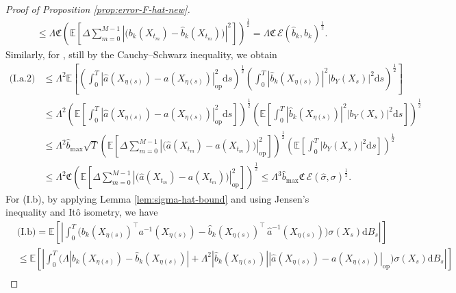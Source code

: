 \documentclass{article}
\theoremstyle{plain}
\theoremstyle{definition}
\theoremstyle{remark}
\renewcommand{\d}{\mathrm{d}}
\newcommand{\EE}{\mathbb{E}}
\newcommand{\calE}{\mathcal{E}}
\begin{document}
\begin{proof}[Proof of Proposition \ref{prop:error-F-hat-new}]
\begin{align}
    &\leq \Lambda \mathfrak{C}\left(\EE \left[\Delta\sum_{m=0}^{M-1}\left|\big( b_k(X_{t_m})-\widehat b_k(X_{t_m})\big)\right|^2\right]\right)^{\frac{1}{2}}=\Lambda \mathfrak{C}\,  \calE(\widehat b_k, b_k)^{\frac{1}{2}}.
\end{align}
Similarly, for , still by the Cauchy–Schwarz inequality,  we obtain 
\begin{align}
    \text{(I.a.2)}&\leq \Lambda^2\EE \left[\left(\int_{0}^T \left|\widehat{a}(X_{\eta(s)})-a(X_{\eta(s)})\right|_{\mathrm{op}}^2\d s\right)^{\frac{1}{2}}\left(\int_{0}^T|\widehat b_k(X_{\eta(s)})|^2\left|b_Y(X_s) \right|^2\d s\right)^{\frac{1}{2}} \right]\nonumber\\
    &\leq \Lambda^2\left(\EE \left[\int_{0}^T \left|\widehat{a}(X_{\eta(s)})-a(X_{\eta(s)})\right|_{\mathrm{op}}^2\d s\right]\right)^{\frac{1}{2}}\left(\EE \left[\int_{0}^T|\widehat{b}_k(X_{\eta(s)})|^2\left|b_Y(X_s) \right|^2\d s \right]\right)^{\frac{1}{2}}\nonumber\\
    &\leq \Lambda^2 \widehat{b}_{\max}\sqrt{T}\left(\EE \left[\Delta\sum_{m=0}^{M-1}\left|\big( \widehat a(X_{t_m})-a(X_{t_m})\big)\right|_{\mathrm{op}}^2\right]\right)^{\frac{1}{2}} \left(\EE \left[\int_{0}^T\left|b_Y(X_s) \right|^2\d s \right]\right)^{\frac{1}{2}}\nonumber\\
    &\leq \Lambda^2\mathfrak{C}\left(\EE \left[\Delta\sum_{m=0}^{M-1}\left|\big( \widehat a(X_{t_m})-a(X_{t_m})\big)\right|_{\mathrm{op}}^2\right]\right)^{\frac{1}{2}}\leq \Lambda^{3}\widehat{b}_{\max}\mathfrak{C}\,\mathcal{E}(\widehat\sigma,\sigma)^{\frac{1}{2}}. \nonumber
\end{align}
For (I.b), by applying Lemma \ref{lem:sigma-hat-bound} and using Jensen's inequality and It\^o isometry, we have
\begin{align}
  & \text{(I.b)}= \EE \left[\left|\int_{0}^T \Big( b_k(X_{\eta(s)})^{\top}a^{-1}(X_{\eta(s)})-\widehat b_k(X_{\eta(s)})^{\top}\,\widehat{a}^{-1}(X_{\eta(s)})\Big)\sigma(X_s) \d B_s \right|\right]\nonumber\\
   &\leq \EE \left[\left|\int_{0}^T \Big( \Lambda |b_k(X_{\eta(s)})-\widehat b_k(X_{\eta(s)})|+\Lambda^2|\widehat b_k(X_{\eta(s)})|\left|\widehat{a}(X_{\eta(s)})-a(X_{\eta(s)})\right|_{\mathrm{op}}\Big)\sigma(X_s) \d B_s \right|\right]\nonumber\\

\end{align}
\end{proof}
\end{document}
